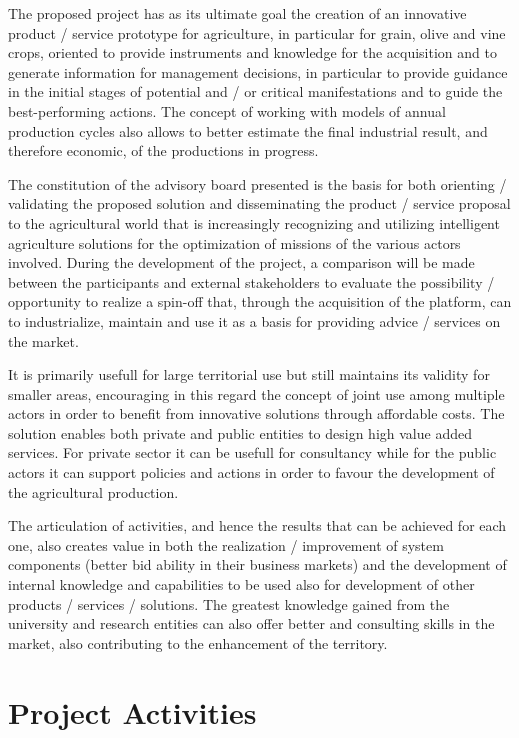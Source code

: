\documentclass[comsoc,final]{IEEEtran}
\begin{document}
The proposed project has as its ultimate goal the creation of an innovative product / service prototype for agriculture, in particular for grain, olive and vine crops, oriented to provide instruments and knowledge for the acquisition and to generate information for management decisions, in particular to provide guidance in the initial stages of potential and / or critical manifestations and to guide the best-performing actions. The concept of working with models of annual production cycles also allows to better estimate the final industrial result, and therefore economic, of the productions in progress.

The constitution of the advisory board presented is the basis for both orienting / validating the proposed solution and disseminating the product / service proposal to the agricultural world that is increasingly recognizing and utilizing intelligent agriculture solutions for the optimization of missions of the various actors involved. During the development of the project, a comparison will be made between the participants and external stakeholders to evaluate the possibility / opportunity to realize a spin-off that, through the acquisition of the platform, can to industrialize, maintain and use it as a basis for providing advice / services on the market.

It is primarily usefull for large territorial use but still maintains its validity for smaller areas, encouraging in this regard the concept of joint use among multiple actors in order to benefit from innovative solutions through affordable costs. The solution enables both private and public entities to design high value added services. For private sector it can be usefull for consultancy while for the public actors it can support policies and actions in order to favour the development of the agricultural production.

The articulation of activities, and hence the results that can be achieved for each one, also creates value in both the realization / improvement of system components (better bid ability in their business markets) and the development of internal knowledge and capabilities to be used also for development of other products / services / solutions. The greatest knowledge gained from the university and research entities can also offer better and consulting skills in the market, also contributing to the enhancement of the territory.

\section{Project Activities}\label{sec:activities}
\end{document}
